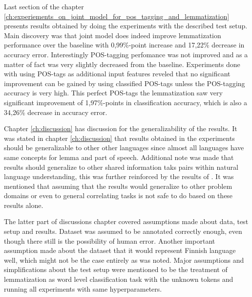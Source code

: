 \documentclass[12pt,a4paper,english
]{tutthesis}
\begin{document}
Last section of the chapter \ref{ch:experiements_on_joint_model_for_pos_tagging_and_lemmatization} presents results obtained by doing the experiments with the described test setup. Main discovery was that joint model does indeed improve lemmatization performance over the baseline with 0,99\%-point increase and 17,22\% decrease in accuracy error. Interestingly POS-tagging perfomance was not improved and as a matter of fact was very slightly decreased from the baseline. Experiments done with using POS-tags as additional input features reveled that no significant improvement can be gained by using classified POS-tags unless the POS-tagging accuracy is very high. This perfect POS-tags the lemmatization saw very significant improvement of 1,97\%-points in classification accuracy, which is also a 34,26\% decrease in accuracy error.

Chapter \ref{ch:discussion} has discussion for the generalizability of the results. It was stated in chapter \ref{ch:discussion} that results obtained in the experiments should be generalizable to other other languages since almost all languages have same concepts for lemma and part of speech. Additional note was made that results should generalize to other shared information taks pairs within natural language understanding, this was further reinforced by the results of \cite{Liu2016a}. It was mentioned that assuming that the results would generalize to other problem domains or even to general correlating tasks is not safe to do based on these results alone. 

The latter part of discussions chapter covered assumptions made about data, test setup and results. Dataset was assumed to be annotated correctly enough, even though there still is the possibility of human error. Another important assumption made about the dataset that it would represent Finnish language well, which might not be the case entirely as was noted. Major assumptions and simplifications about the test setup were mentioned to be the treatment of lemmatization as word level classification task with the unknown tokens and running all experiments with same hyperparameters.
\end{document}

